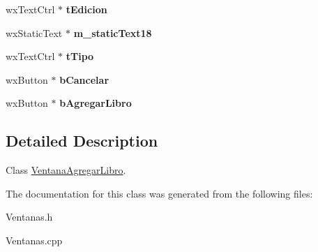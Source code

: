 \begin{DoxyCompactItemize}
\item 
wx\+Text\+Ctrl $\ast$ {\bfseries t\+Edicion}\hypertarget{class_ventana_agregar_libro_a3bf5ea3a402525b7085689bf4e0afae5}{}\label{class_ventana_agregar_libro_a3bf5ea3a402525b7085689bf4e0afae5}

\item 
wx\+Static\+Text $\ast$ {\bfseries m\+\_\+static\+Text18}\hypertarget{class_ventana_agregar_libro_acff559e7bf09b29813593bc142daa934}{}\label{class_ventana_agregar_libro_acff559e7bf09b29813593bc142daa934}

\item 
wx\+Text\+Ctrl $\ast$ {\bfseries t\+Tipo}\hypertarget{class_ventana_agregar_libro_aa210a8acb799094bb8476afe4c9e1ae8}{}\label{class_ventana_agregar_libro_aa210a8acb799094bb8476afe4c9e1ae8}

\item 
wx\+Button $\ast$ {\bfseries b\+Cancelar}\hypertarget{class_ventana_agregar_libro_ad51b9dbf930da1a35e939c597558aca5}{}\label{class_ventana_agregar_libro_ad51b9dbf930da1a35e939c597558aca5}

\item 
wx\+Button $\ast$ {\bfseries b\+Agregar\+Libro}\hypertarget{class_ventana_agregar_libro_aced204df0393cdc66d39ec9eccbd579f}{}\label{class_ventana_agregar_libro_aced204df0393cdc66d39ec9eccbd579f}

\end{DoxyCompactItemize}


\subsection{Detailed Description}
Class \hyperlink{class_ventana_agregar_libro}{Ventana\+Agregar\+Libro}. 

The documentation for this class was generated from the following files\+:\begin{DoxyCompactItemize}
\item 
Ventanas.\+h\item 
Ventanas.\+cpp\end{DoxyCompactItemize}
